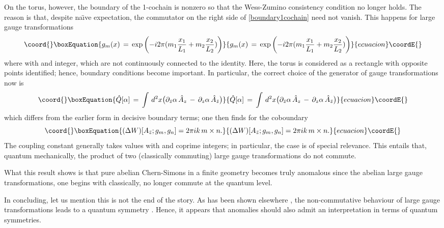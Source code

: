 \documentclass[a4paper,10pt]{article}
\begin{document}
On the torus, however, the boundary of the 1-cochain is nonzero so that the Wess-Zumino 
consistency condition no longer holds. The reason is that, despite 
na\"\i ve expectation, the commutator on the right side of \eqref{boundary1cochain} 
need not vanish. This happens for large gauge transformations 
\begin{equation}\coord{}\boxEquation{g_m(x)\,=\,\exp\left(-i2\pi(m_1\frac{x_1}{L_1}+m_2\frac{x_2}{L_2})\right)
}{g_m(x)\,=\,\exp\left(-i2\pi(m_1\frac{x_1}{L_1}+m_2\frac{x_2}{L_2})\right)
}{ecuacion}\coordE{}\end{equation}
where \coordHE{} with \coordHE{} and \coordHE{} integer, which are not continuously connected to 
the identity. Here, the torus is considered as a rectangle \coordHE{} with opposite 
points identified; hence, boundary conditions become important. In particular, the 
correct choice of the generator of gauge transformations now is
\begin{equation}\coord{}\boxEquation{
\hat{Q}[\alpha]\,=\,\int\,d^2x\big(\partial_{\bar{z}}\alpha\,\hat{A}_z\,-
\,\partial_z\alpha\,\hat{A}_{\bar{z}}\big)
}{
\hat{Q}[\alpha]\,=\,\int\,d^2x\big(\partial_{\bar{z}}\alpha\,\hat{A}_z\,-
\,\partial_z\alpha\,\hat{A}_{\bar{z}}\big)
}{ecuacion}\coordE{}\end{equation}
which differs from the earlier form in decisive boundary terms; one then finds for the 
coboundary
\begin{equation}\coord{}\boxEquation{
(\Delta W)[A_{\bar{z}};g_m,g_n]=2\pi ik\,m\times n.
}{
(\Delta W)[A_{\bar{z}};g_m,g_n]=2\pi ik\,m\times n.
}{ecuacion}\coordE{}\end{equation}
The coupling constant generally takes values \coordHE{} with \coordHE{} and \coordHE{} coprime integers;  
in particular, the case \coordHE{} is of special relevance. This entails that, quantum 
mechanically, the product of two (classically commuting) large gauge transformations do 
not commute.

What this result shows is that pure abelian Chern-Simons in a finite geometry becomes 
truly anomalous since the abelian large gauge transformations, one begins with 
classically, no longer commute at the quantum level.

In concluding, let us mention this is not the end of the story. As has been shown 
elsewhere \cite{Gren 98,Gren 00}, the non-commutative behaviour of large gauge 
transformations leads to a quantum symmetry \cite{Char 94}. Hence, it appears that 
anomalies should also admit an interpretation in terms of quantum symmetries.
\end{document}
